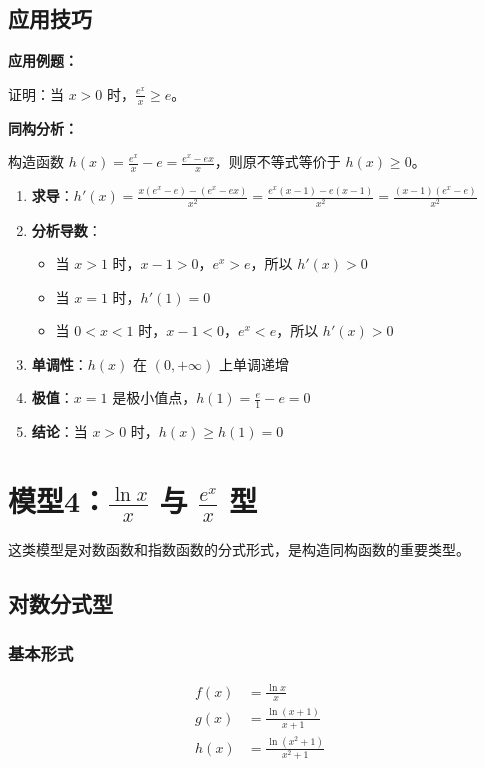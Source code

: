 \documentclass[a4paper,11pt]{ctexrep}
\newcommand{\exampleicon}{\ModeBadge[highlight]{例题}}
\newcommand{\analysisicon}{\ModeBadge[secondary]{分析}}
\theoremstyle{definition}
\begin{document}
\subsection{应用技巧}

\exampleicon \textbf{应用例题：}

证明：当 $x > 0$ 时，$\frac{e^x}{x} \geq e$。

\analysisicon \textbf{同构分析：}

构造函数 $h(x) = \frac{e^x}{x} - e = \frac{e^x - ex}{x}$，则原不等式等价于 $h(x) \geq 0$。

\begin{enumerate}
    \item \textbf{求导}：$h'(x) = \frac{x(e^x - e) - (e^x - ex)}{x^2} = \frac{e^x(x-1) - e(x-1)}{x^2} = \frac{(x-1)(e^x - e)}{x^2}$
    \item \textbf{分析导数}：
    \begin{itemize}
        \item 当 $x > 1$ 时，$x-1 > 0$，$e^x > e$，所以 $h'(x) > 0$
        \item 当 $x = 1$ 时，$h'(1) = 0$
        \item 当 $0 < x < 1$ 时，$x-1 < 0$，$e^x < e$，所以 $h'(x) > 0$
    \end{itemize}
    \item \textbf{单调性}：$h(x)$ 在 $(0, +\infty)$ 上单调递增
    \item \textbf{极值}：$x = 1$ 是极小值点，$h(1) = \frac{e}{1} - e = 0$
    \item \textbf{结论}：当 $x > 0$ 时，$h(x) \geq h(1) = 0$
\end{enumerate}

\section{模型4：$\frac{\ln x}{x}$ 与 $\frac{e^x}{x}$ 型}

这类模型是对数函数和指数函数的分式形式，是构造同构函数的重要类型。

\subsection{对数分式型}

\subsubsection{基本形式}

\begin{definitionbox}[对数分式型]
\begin{align}
f(x) &= \frac{\ln x}{x} \\
g(x) &= \frac{\ln(x+1)}{x+1} \\
h(x) &= \frac{\ln(x^2+1)}{x^2+1}
\end{align}
\end{definitionbox}
\end{document}
